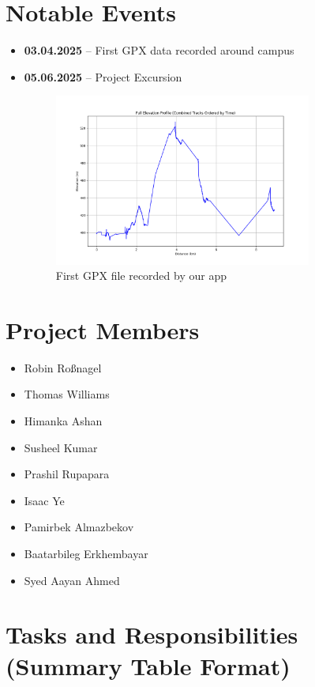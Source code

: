 \documentclass[12pt]{article}
\begin{document}
\section{Notable Events}
\begin{itemize}
    \item \textbf{03.04.2025} – First GPX data recorded around campus
    \item \textbf{05.06.2025} – Project Excursion
    \begin{figure}[h!]
    \centering
    \includegraphics[width=0.8\textwidth]{Project_Screenshots/guessitworked.png}
    \caption{First GPX file recorded by our app}
\end{figure}
\end{itemize}

\newpage
\section{Project Members}
\begin{itemize}
    \item Robin Roßnagel
    \item Thomas Williams
    \item Himanka Ashan
    \item Susheel Kumar
    \item Prashil Rupapara
    \item Isaac Ye
    \item Pamirbek Almazbekov
    \item Baatarbileg Erkhembayar
    \item Syed Aayan Ahmed
\end{itemize}

\newpage
\section{Tasks and Responsibilities (Summary Table Format)}
\end{document}
